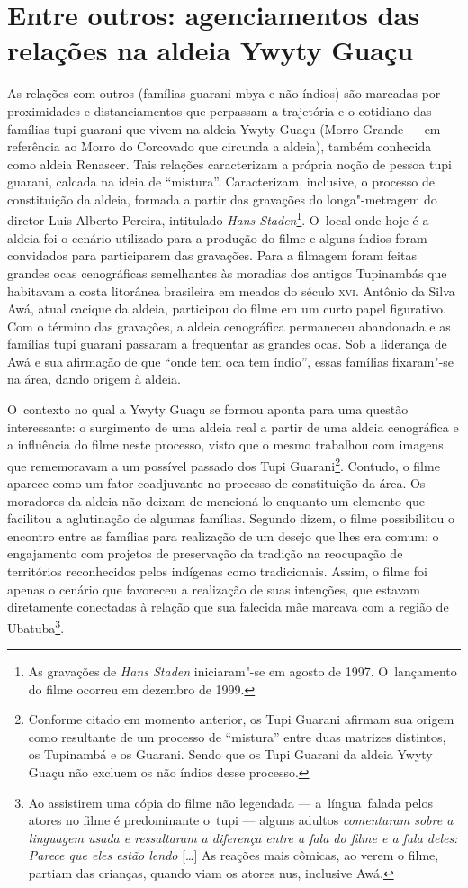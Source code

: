 \section{Entre outros: agenciamentos das relações na aldeia Ywyty Guaçu} 

As relações com outros (famílias guarani mbya e não índios) são marcadas
por proximidades e distanciamentos que perpassam a trajetória e o
cotidiano das famílias tupi guarani que vivem na aldeia Ywyty Guaçu
(Morro Grande --- em referência ao Morro do Corcovado que circunda a
aldeia), também conhecida como aldeia Renascer. Tais relações
caracterizam a própria noção de pessoa tupi guarani, calcada na ideia
de ``mistura''. Caracterizam, inclusive, o processo de constituição da
aldeia, formada a partir das gravações do longa"-metragem do diretor
Luis Alberto Pereira, intitulado \emph{Hans Staden}\footnote{As gravações de
\emph{Hans Staden} iniciaram"-se em agosto de 1997. O~lançamento do filme
ocorreu em dezembro de 1999.}. O~local onde hoje é a aldeia foi o
cenário utilizado para a produção do filme e alguns índios foram
convidados para participarem das gravações. Para a filmagem foram
feitas grandes ocas cenográficas semelhantes às moradias dos antigos
Tupinambás que habitavam a costa litorânea brasileira em meados do
século \textsc{xvi}. Antônio da Silva Awá, atual cacique da aldeia, participou
do filme em um curto papel figurativo. Com o término das gravações, a
aldeia cenográfica permaneceu abandonada e as famílias tupi guarani
passaram a frequentar as grandes ocas. Sob a liderança de Awá e sua
afirmação de que ``onde tem oca tem índio'', essas famílias fixaram"-se na
área, dando origem à aldeia.

O~contexto no qual a Ywyty Guaçu se formou aponta para uma questão
interessante: o surgimento de uma aldeia real a partir de uma aldeia
cenográfica e a influência do filme neste processo, visto que o mesmo
trabalhou com imagens que rememoravam a um possível passado dos Tupi
Guarani\footnote{Conforme citado em momento anterior, os Tupi Guarani
afirmam sua origem como resultante de um processo de ``mistura'' entre duas
matrizes distintos, os Tupinambá e os Guarani. Sendo que os Tupi
Guarani da aldeia Ywyty Guaçu não excluem os não índios desse
processo.}. Contudo, o filme aparece como um fator coadjuvante no
processo de constituição da área. Os moradores da aldeia não deixam de
mencioná-lo enquanto um elemento que facilitou a aglutinação de algumas
famílias. Segundo dizem, o filme possibilitou o encontro entre as
famílias para realização de um desejo que lhes era comum: o engajamento
com projetos de preservação da tradição na reocupação de territórios
reconhecidos pelos indígenas como tradicionais. Assim, o filme foi
apenas o cenário que favoreceu a realização de suas intenções, que
estavam diretamente conectadas à relação que sua falecida mãe marcava
com a região de Ubatuba\footnote{Ao assistirem uma cópia do filme não
legendada --- a~língua~falada pelos atores no filme é predominante o~tupi
--- alguns adultos \emph{comentaram sobre a linguagem usada e ressaltaram
a diferença entre a fala do filme e a fala deles: }\emph{Parece que
eles estão lendo} [\ldots{}] As reações mais cômicas, ao verem o filme, partiam
das crianças, quando viam os atores nus, inclusive Awá.}.

